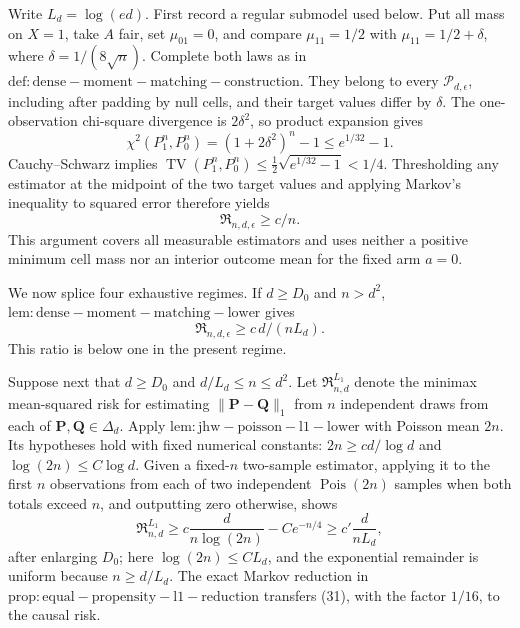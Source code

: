 Write \(L_d=\log(ed)\).  First record a regular submodel used below.  Put all mass on \(X=1\), take \(A\) fair, set \(\mu_{01}=0\), and compare \(\mu_{11}=1/2\) with \(\mu_{11}=1/2+\delta\), where \(\delta=1/(8\sqrt n)\).  Complete both laws as in \(\mathrm{def:dense-moment-matching-construction}\).  They belong to every \(\mathcal P_{d,\epsilon}\), including after padding by null cells, and their target values differ by \(\delta\).  The one-observation chi-square divergence is \(2\delta^2\), so product expansion gives
\[
 \chi^2(P_1^n,P_0^n)=(1+2\delta^2)^n-1\leq e^{1/32}-1.
\]
Cauchy--Schwarz implies \(\operatorname{TV}(P_1^n,P_0^n)\leq\tfrac12\sqrt{e^{1/32}-1}<1/4\).  Thresholding any estimator at the midpoint of the two target values and applying Markov's inequality to squared error therefore yields
\[
 \mathfrak R_{n,d,\epsilon}\geq c/n.                                 \tag{30}
\]
This argument covers all measurable estimators and uses neither a positive minimum cell mass nor an interior outcome mean for the fixed arm \(a=0\).

We now splice four exhaustive regimes.  If \(d\geq D_0\) and \(n>d^2\), \(\mathrm{lem:dense-moment-matching-lower}\) gives
\[
 \mathfrak R_{n,d,\epsilon}\geq c\,d/(nL_d).
\]
This ratio is below one in the present regime.

Suppose next that \(d\geq D_0\) and \(d/L_d\leq n\leq d^2\).  Let \(\mathfrak R^{L_1}_{n,d}\) denote the minimax mean-squared risk for estimating \(\|\mathbf P-\mathbf Q\|_1\) from \(n\) independent draws from each of \(\mathbf P,\mathbf Q\in\Delta_d\).  Apply \(\mathrm{lem:jhw-poisson-l1-lower}\) with Poisson mean \(2n\).  Its hypotheses hold with fixed numerical constants: \(2n\geq c d/\log d\) and \(\log(2n)\leq C\log d\).  Given a fixed-\(n\) two-sample estimator, applying it to the first \(n\) observations from each of two independent \(\operatorname{Pois}(2n)\) samples when both totals exceed \(n\), and outputting zero otherwise, shows
\[
 \mathfrak R^{L_1}_{n,d}\geq c\frac d{n\log(2n)}-C e^{-n/4}
 \geq c'\frac d{nL_d},                                                \tag{31}
\]
after enlarging \(D_0\); here \(\log(2n)\leq C L_d\), and the exponential remainder is uniform because \(n\geq d/L_d\).  The exact Markov reduction in \(\mathrm{prop:equal-propensity-l1-reduction}\) transfers (31), with the factor \(1/16\), to the causal risk.

